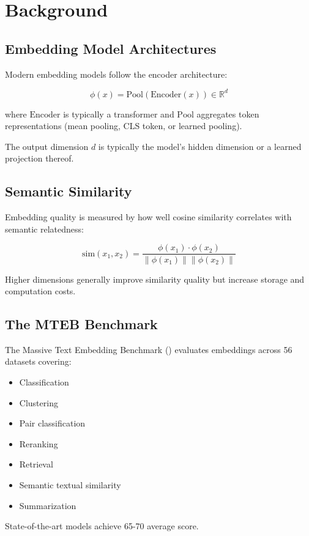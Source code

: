 \section{Background}


\subsection{Embedding Model Architectures}

Modern embedding models follow the encoder architecture:

\begin{equation}
\phi(x) = \text{Pool}(\text{Encoder}(x)) \in \mathbb{R}^d
\end{equation}

where $\text{Encoder}$ is typically a transformer and $\text{Pool}$ aggregates token representations (mean pooling, CLS token, or learned pooling).

The output dimension $d$ is typically the model's hidden dimension or a learned projection thereof.

\subsection{Semantic Similarity}

Embedding quality is measured by how well cosine similarity correlates with semantic relatedness:

\begin{equation}
\text{sim}(x_1, x_2) = \frac{\phi(x_1) \cdot \phi(x_2)}{\|\phi(x_1)\| \|\phi(x_2)\|}
\end{equation}

Higher dimensions generally improve similarity quality but increase storage and computation costs.

\subsection{The MTEB Benchmark}

The Massive Text Embedding Benchmark (\MTEB{}) evaluates embeddings across 56 datasets covering:
\begin{itemize}
    \item Classification
    \item Clustering
    \item Pair classification
    \item Reranking
    \item Retrieval
    \item Semantic textual similarity
    \item Summarization
\end{itemize}

State-of-the-art models achieve 65-70 average score.

